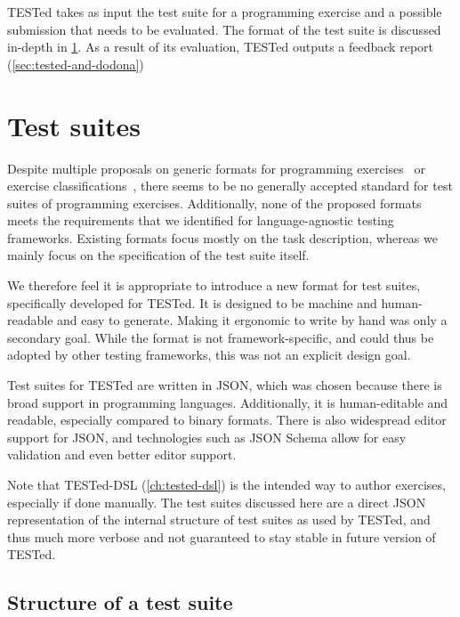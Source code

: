 \documentclass[../main]{subfiles}
\begin{document}
TESTed takes as input the test suite for a programming exercise and a possible submission that needs to be evaluated.
The format of the test suite is discussed in-depth in \cref{sec:test-suites}.
As a result of its evaluation, TESTed outputs a feedback report (\cref{sec:tested-and-dodona})

\section{Test suites}\label{sec:test-suites}

Despite multiple proposals on generic formats for programming exercises~\autocite{edwardsDevelopingCommonFormat2008a,paivaAnotherProgrammingExercises2020,queirosPexilProgrammingExercises2011,verhoeffProgrammingTaskPackages2008} or exercise classifications~\autocite{leOperationalizingContinuumWelldefined2013,simoesNatureProgrammingExercises2020}, there seems to be no generally accepted standard for test suites of programming exercises.
Additionally, none of the proposed formats meets the requirements that we identified for language-agnostic testing frameworks.
Existing formats focus mostly on the task description, whereas we mainly focus on the specification of the test suite itself.

We therefore feel it is appropriate to introduce a new format for test suites, specifically developed for TESTed.
It is designed to be machine and human-readable and easy to generate.
Making it ergonomic to write by hand was only a secondary goal.
While the format is not framework-specific, and could thus be adopted by other testing frameworks, this was not an explicit design goal.

Test suites for TESTed are written in JSON, which was chosen because there is broad support in programming languages.
Additionally, it is human-editable and readable, especially compared to binary formats.
There is also widespread editor support for JSON, and technologies such as JSON Schema allow for easy validation and even better editor support.

Note that TESTed-DSL (\cref{ch:tested-dsl}) is the intended way to author exercises, especially if done manually.
The test suites discussed here are a direct JSON representation of the internal structure of test suites as used by TESTed, and thus much more verbose and not guaranteed to stay stable in future version of TESTed.

\subsection{Structure of a test suite}\label{subsec:structure-of-a-test-suite}
\end{document}
